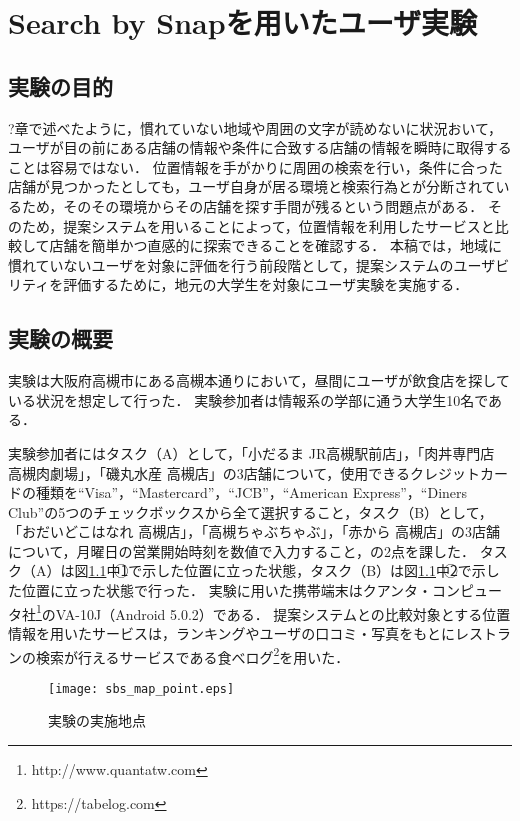 \chapter{Search by Snapを用いたユーザ実験}
\section{実験の目的}
  ?章で述べたように，慣れていない地域や周囲の文字が読めないに状況おいて，ユーザが目の前にある店舗の情報や条件に合致する店舗の情報を瞬時に取得することは容易ではない．
  位置情報を手がかりに周囲の検索を行い，条件に合った店舗が見つかったとしても，ユーザ自身が居る環境と検索行為とが分断されているため，そのその環境からその店舗を探す手間が残るという問題点がある．
  そのため，提案システムを用いることによって，位置情報を利用したサービスと比較して店舗を簡単かつ直感的に探索できることを確認する．
  本稿では，地域に慣れていないユーザを対象に評価を行う前段階として，提案システムのユーザビリティを評価するために，地元の大学生を対象にユーザ実験を実施する．

\section{実験の概要}
  実験は大阪府高槻市にある高槻本通りにおいて，昼間にユーザが飲食店を探している状況を想定して行った．
  実験参加者は情報系の学部に通う大学生10名である．

  実験参加者にはタスク（A）として，「小だるま JR高槻駅前店」，「肉丼専門店 高槻肉劇場」，「磯丸水産 高槻店」の3店舗について，使用できるクレジットカードの種類を``Visa''，``Mastercard''，``JCB''，``American Express''，``Diners Club''の5つのチェックボックスから全て選択すること，タスク（B）として，「おだいどこはなれ 高槻店」，「高槻ちゃぶちゃぶ」，「赤から 高槻店」の3店舗について，月曜日の営業開始時刻を数値で入力すること，の2点を課した．
  タスク（A）は図\ref{fig:exp_point}中\textcircled{\scriptsize 1}で示した位置に立った状態，タスク（B）は図\ref{fig:exp_point}中\textcircled{\scriptsize 2}で示した位置に立った状態で行った．
  実験に用いた携帯端末はクアンタ・コンピュータ社\footnote{http://www.quantatw.com}のVA-10J（Android 5.0.2）である．
  提案システムとの比較対象とする位置情報を用いたサービスは，ランキングやユーザの口コミ・写真をもとにレストランの検索が行えるサービスである食べログ\footnote{https://tabelog.com}を用いた．

\begin{figure}[tb]
  \begin{center}
    \texttt{[image: sbs\_map\_point.eps]}
    \caption{実験の実施地点}
    \label{fig:exp_point}
  \end{center}
\end{figure}

